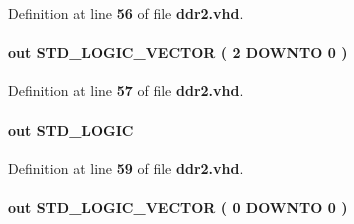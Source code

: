 Definition at line {\bf 56} of file {\bf ddr2.\+vhd}.

\paragraph[{mem\+\_\+ba}]{ {\bfseries \textcolor{keywordflow}{out}\textcolor{vhdlchar}{ }} {\bfseries \textcolor{comment}{S\+T\+D\+\_\+\+L\+O\+G\+I\+C\+\_\+\+V\+E\+C\+T\+OR}\textcolor{vhdlchar}{ }\textcolor{vhdlchar}{(}\textcolor{vhdlchar}{ }\textcolor{vhdlchar}{ } \textcolor{vhdldigit}{2} \textcolor{vhdlchar}{ }\textcolor{keywordflow}{D\+O\+W\+N\+TO}\textcolor{vhdlchar}{ }\textcolor{vhdlchar}{ } \textcolor{vhdldigit}{0} \textcolor{vhdlchar}{ }\textcolor{vhdlchar}{)}\textcolor{vhdlchar}{ }} \hspace{0.3cm}{\ttfamily [Port]}}\label{classddr2_a69c33ce1ac1c700098b4119f71a8b9ca}


Definition at line {\bf 57} of file {\bf ddr2.\+vhd}.

\paragraph[{mem\+\_\+cas\+\_\+n}]{ {\bfseries \textcolor{keywordflow}{out}\textcolor{vhdlchar}{ }} {\bfseries \textcolor{comment}{S\+T\+D\+\_\+\+L\+O\+G\+IC}\textcolor{vhdlchar}{ }} \hspace{0.3cm}{\ttfamily [Port]}}\label{classddr2_ae93246f37c66946ff9a04845c2f74597}


Definition at line {\bf 59} of file {\bf ddr2.\+vhd}.

\paragraph[{mem\+\_\+cke}]{ {\bfseries \textcolor{keywordflow}{out}\textcolor{vhdlchar}{ }} {\bfseries \textcolor{comment}{S\+T\+D\+\_\+\+L\+O\+G\+I\+C\+\_\+\+V\+E\+C\+T\+OR}\textcolor{vhdlchar}{ }\textcolor{vhdlchar}{(}\textcolor{vhdlchar}{ }\textcolor{vhdlchar}{ } \textcolor{vhdldigit}{0} \textcolor{vhdlchar}{ }\textcolor{keywordflow}{D\+O\+W\+N\+TO}\textcolor{vhdlchar}{ }\textcolor{vhdlchar}{ } \textcolor{vhdldigit}{0} \textcolor{vhdlchar}{ }\textcolor{vhdlchar}{)}\textcolor{vhdlchar}{ }} \hspace{0.3cm}{\ttfamily [Port]}}\label{classddr2_ab5e2761b7646abfbd3a2582181a23949}


